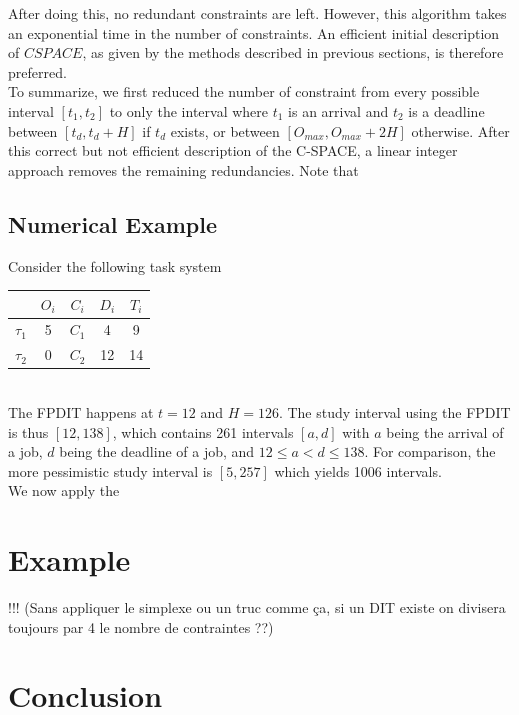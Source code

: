 \documentclass[times, 10pt,twocolumn, a4paper]{article}
\begin{document}
After doing this, no redundant constraints are left. However, this algorithm takes an exponential time in the number of constraints. An efficient initial description of $CSPACE$, as given by the methods described in previous sections, is therefore preferred.\\

To summarize, we first reduced the number of constraint from every possible interval $[t_1, t_2]$ to only the interval where $t_1$ is an arrival and $t_2$ is a deadline between $[t_d, t_d + H]$ if $t_d$ exists, or between $[O_{max}, O_{max} + 2H]$ otherwise. After this correct but not efficient description of the C-SPACE, a linear integer approach removes the remaining redundancies. Note that

\subsection{Numerical Example}

Consider the following task system

		\begin{center}
		\begin{tabular}{|r|c|c|c|c|}
		 \hline
		  & $O_i$ & $C_i$ & $D_i$ & $T_i$ \\
		 \hline
		 $\tau_1$ & 5 & $C_1$ & 4 & 9\\
		 \hline
		 $\tau_2$ & 0 & $C_2$ & 12 & 14\\
		 \hline
		\end{tabular}
		\end{center}
		~\\

The FPDIT happens at $t=12$ and $H = 126$. The study interval using the FPDIT is thus $[12, 138]$, which contains 261 intervals $[a,d]$ with $a$ being the arrival of a job, $d$ being the deadline of a job, and $12 \leqslant a < d \leqslant 138$. For comparison, the more pessimistic study interval is $[5, 257]$ which yields 1006 intervals.\\

We now apply the

\section{Example}

!!! (Sans appliquer le simplexe ou un truc comme ça, si un DIT existe on divisera toujours par 4 le nombre de contraintes ??)

\section{Conclusion}



\end{document}
